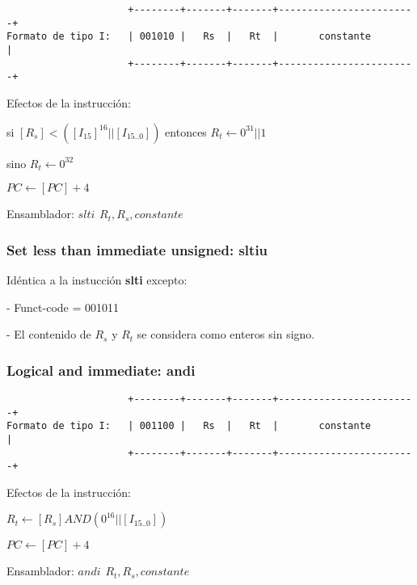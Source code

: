 \documentclass[letterpaper,11pt]{scrartcl}
\begin{document}
\begin{verbatim}
                     +--------+-------+-------+------------------------+ 
Formato de tipo I:   | 001010 |   Rs  |   Rt  |       constante        | 
                     +--------+-------+-------+------------------------+ 
\end{verbatim}

Efectos de la instrucción: 

si $[R_{s}] < ([I_{15}]^{16}||[I_{15..0}])$ entonces $R_{t} \leftarrow 0^{31} || 1$

sino $R_{t} \leftarrow 0^{32}$

$PC \leftarrow [PC] + 4$

Ensamblador: $slti\hspace{5pt}R_{t}, R_{s}, constante$


\subsubsection*{Set less than immediate unsigned: \textbf{sltiu}}

Idéntica a la instucción \textbf{slti} excepto:

- Funct-code = 001011

- El contenido de $R_{s}$ y $R_{t}$ se considera como enteros sin signo.



\subsubsection*{Logical and immediate: \textbf{andi}}

\begin{verbatim}
                     +--------+-------+-------+------------------------+ 
Formato de tipo I:   | 001100 |   Rs  |   Rt  |       constante        | 
                     +--------+-------+-------+------------------------+ 
\end{verbatim}

Efectos de la instrucción: 

$R_{t} \leftarrow [R_{s}]AND (0^{16} || [I_{15..0}])$

$PC \leftarrow [PC] + 4$

Ensamblador: $andi\hspace{5pt}R_{t}, R_{s}, constante$
\end{document}
